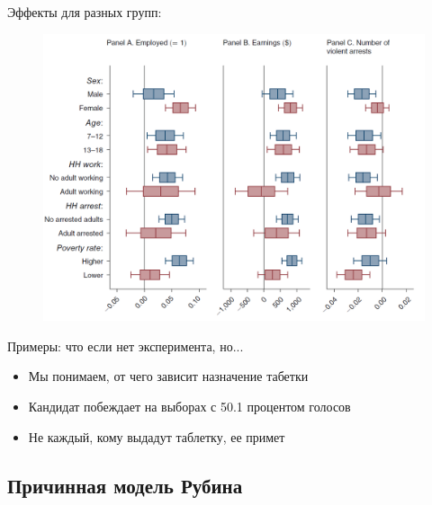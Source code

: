 \begin{frame}{Эффекты для разных групп: \textcite{chyn2018moved}}
\begin{figure}
    \centering
    \includegraphics[width=\textwidth]{Images/Chicago2.png}
\end{figure}

 
\end{frame}
\begin{frame}{Примеры: что если нет эксперимента, но...}

\begin{itemize}
    \item Мы понимаем, от чего зависит назначение табетки
    \item Кандидат побеждает на выборах с 50.1 процентом голосов
    \item Не каждый, кому выдадут таблетку, ее примет
\end{itemize}

\end{frame}

\subsection{Причинная модель Рубина}



